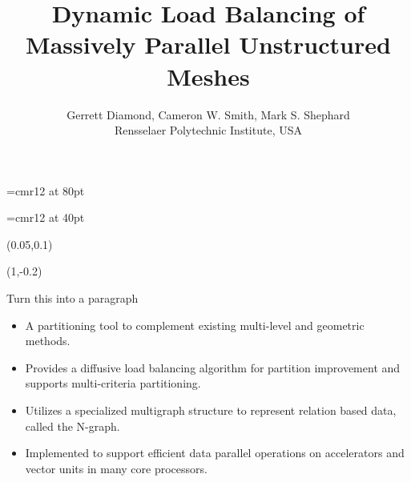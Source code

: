 \documentclass{beamer}
\begin{document}
\font\titlefont=cmr12 at 80pt
\title[Load Balancing of Unstructured Meshes]
      {\titlefont
        Dynamic Load Balancing of \\[0.3cm]Massively Parallel Unstructured Meshes
      }
      \font\authorfont=cmr12 at 40pt
      \author[G. Diamond]{\authorfont
        Gerrett Diamond, Cameron W. Smith, Mark S. Shephard\\
        Rensselaer Polytechnic Institute, USA}
      \date{}

      \begin{textblock}{15.8}(0.05,0.1)
        \titlepage
        \begin{textblock}{14}(1,-0.2)
          \begin{block}{}
            Turn this into a paragraph
            \begin{itemize}
            \item A partitioning tool to complement existing multi-level and geometric methods.
            \item Provides a diffusive load balancing algorithm for partition improvement and supports multi-criteria partitioning.
            \item Utilizes a specialized multigraph structure to represent relation based data, called the N-graph.
            \item Implemented to support efficient data parallel operations on accelerators and vector units in many core processors.
            \end{itemize}
          \end{block}
        \end{textblock}
      \end{textblock}
\end{document}
